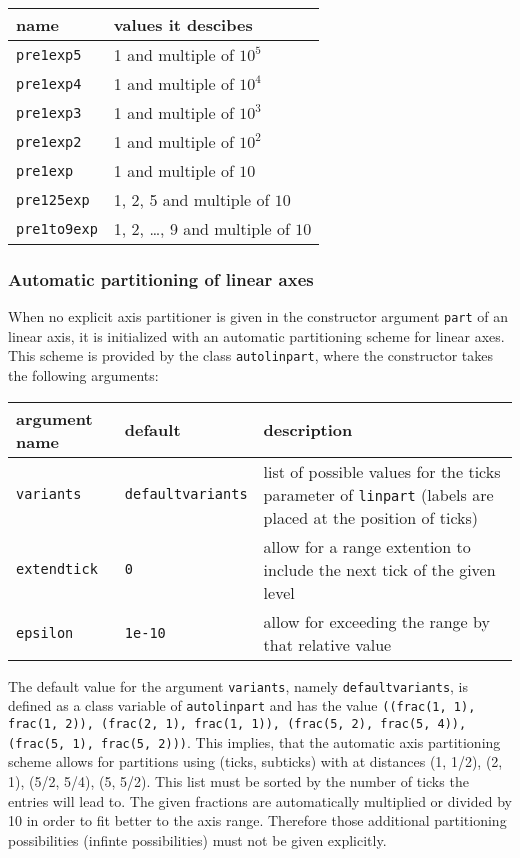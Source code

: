 \begin{center}
\begin{tabular}{ll}
name&values it descibes\\
\hline
\texttt{pre1exp5}&1 and multiple of $10^5$\\
\texttt{pre1exp4}&1 and multiple of $10^4$\\
\texttt{pre1exp3}&1 and multiple of $10^3$\\
\texttt{pre1exp2}&1 and multiple of $10^2$\\
\texttt{pre1exp}&1 and multiple of $10$\\
\texttt{pre125exp}&1, 2, 5 and multiple of $10$\\
\texttt{pre1to9exp}&1, 2, \dots, 9 and multiple of $10$\\
\end{tabular}
\end{center}

\subsubsection{Automatic partitioning of linear axes}

When no explicit axis partitioner is given in the constructor argument
\verb|part| of an linear axis, it is initialized with an automatic
partitioning scheme for linear axes. This scheme is provided by the
class \verb|autolinpart|, where the constructor takes the following
arguments:

\medskip
\begin{tabularx}{\linewidth}{ll>{\raggedright\arraybackslash}X}
argument name&default&description\\
\hline
\texttt{variants}&\texttt{defaultvariants}&list of possible values for the ticks parameter of \texttt{linpart} (labels are placed at the position of ticks)\\
\texttt{extendtick}&\texttt{0}&allow for a range extention to include the next tick of the given level\\
\texttt{epsilon}&\texttt{1e-10}&allow for exceeding the range by that relative value\\
\end{tabularx}
\medskip

The default value for the argument \verb|variants|, namely
\verb|defaultvariants|, is defined as a class variable of
\verb|autolinpart| and has the value \texttt{((frac(1, 1), frac(1,
2)), (frac(2, 1), frac(1, 1)), (frac(5, 2), frac(5, 4)), (frac(5, 1),
frac(5, 2)))}. This implies, that the automatic axis partitioning
scheme allows for partitions using (ticks, subticks) with at distances
(1, 1/2), (2, 1), (5/2, 5/4), (5, 5/2). This list must be sorted by
the number of ticks the entries will lead to. The given fractions are
automatically multiplied or divided by 10 in order to fit better to
the axis range. Therefore those additional partitioning possibilities
(infinte possibilities) must not be given explicitly.

